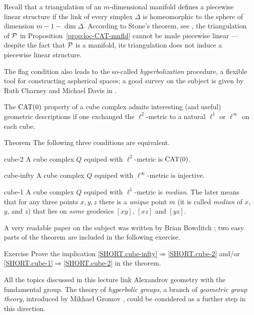 Recall that a triangulation of an $m$-dimensional manifold defines a piecewise linear structure if the link  of every simplex $\Delta$ is homeomorphic to the sphere of dimension $m-1-\dim\Delta$.
According to Stone's theorem, see \cite{stone, davis-januszkiewicz}, the triangulation of $\mathcal{P}$ in Proposition~\ref{prop:loc-CAT-mnfld} 
cannot be made piecewise linear --- despite  the fact that $\mathcal{P}$ is a manifold, its triangulation does not induce a piecewise linear structure.

The flag condition also leads to the so-called {}\emph{hyperbolization} procedure, a flexible tool for constructing  aspherical spaces;
a good survey on the subject is given by Ruth Charney and Michael Davis in \cite{charney-davis-1995}.

The $\mathrm{CAT}(0)$ property of a cube complex admits interesting (and useful) geometric descriptions if one exchanged the $\ell^2$-metric to a natural $\ell^1$ or $\ell^\infty$ on each cube.

\begin{thm}{Theorem}
The following three conditions are equivalent.

\begin{subthm}{cube-2} A cube complex $Q$ equiped with $\ell^2$-metric is $\mathrm{CAT}(0)$.
\end{subthm}

\begin{subthm}{cube-infty} A cube complex $Q$ equiped with $\ell^\infty$-metric is injective.
\end{subthm}

\begin{subthm}{cube-1} A cube complex $Q$ equiped with $\ell^1$-metric is \emph{median}.
 The later means that for any three points $x,y,z$ there is a {}\emph{unique} point   $m$ (it is called \emph{median} of $x$, $y$, and $z$) that lies on {}\emph{some} geodesics $[xy]$, $[xz]$ and $[yz]$.
\end{subthm}
\end{thm}

A very readable paper on the subject was written by Brian Bowditch \cite{bowditch-2020}; two easy parts of the theorem are included in the following exercise.

\begin{thm}{Exercise}\label{ex:cube-infty=>cube-2} Prove the implication \ref{SHORT.cube-infty}$\Rightarrow$\ref{SHORT.cube-2} and/or \ref{SHORT.cube-1}$\Rightarrow$\ref{SHORT.cube-2} in the theorem.
\end{thm}


All the topics discussed in this lecture link Alexandrov geometry with the fundamental group.
The theory of {}\emph{hyperbolic groups}, 
a branch of {}\emph{geometric group theory}, 
introduced by 
Mikhael Gromov \cite{gromov-1987},
could be considered as a further step in this direction.



